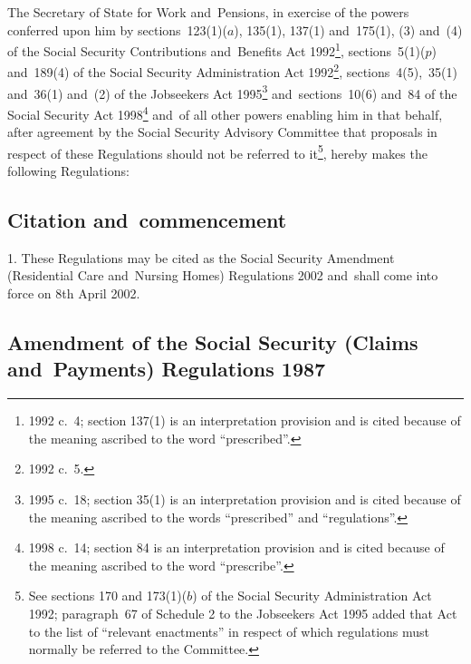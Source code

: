 \documentclass[12pt,a4paper]{article}
\title{\regstitle}
\author{S.I.\ 2002 No.\ 398}
\date{Made
21st February 2002\\
Laid before Parliament
27th February 2002\\
Coming into~force
8th April 2002
}
\begin{document}
\maketitle

\noindent
The Secretary of State for Work and~Pensions, in exercise of the powers conferred upon him by sections~123(1)($a$), 135(1), 137(1) and~175(1), (3) and~(4) of the Social Security Contributions and~Benefits Act 1992\footnote{1992 c.~4; section 137(1) is an interpretation provision and is cited because of the meaning ascribed to the word “prescribed”.}, sections~5(1)($p$)  and~189(4) of the Social Security Administration Act 1992\footnote{1992 c.~5.}, sections~4(5),~35(1) and~36(1) and~(2) of the Jobseekers Act 1995\footnote{1995 c.~18; section 35(1) is an interpretation provision and is cited because of the meaning ascribed to the words “prescribed” and “regulations”.} and~sections~10(6) and~84 of the Social Security Act 1998\footnote{1998 c.~14; section 84 is an interpretation provision and is cited because of the meaning ascribed to the word “prescribe”.} and~of all other powers enabling him in that behalf, after agreement by the Social Security Advisory Committee that proposals in respect of these Regulations should not be referred to it\footnote{See sections 170 and 173(1)($b$)  of the Social Security Administration Act 1992; paragraph~67 of Schedule 2 to the Jobseekers Act 1995 added that Act to the list of “relevant enactments” in respect of which regulations must normally be referred to the Committee.}, hereby makes the following Regulations: 

{\sloppy

\tableofcontents

}

\bigskip

\setcounter{secnumdepth}{-2}

\subsection[1. Citation and~commencement]{Citation and~commencement}

1.  These Regulations may be cited as the Social Security Amendment (Residential Care and~Nursing Homes) Regulations 2002 and~shall come into force on 8th April 2002.

\subsection[2. Amendment of the Social Security (Claims and~Payments) Regulations 1987]{Amendment of the Social Security (Claims and~Payments) Regulations 1987}
\end{document}
